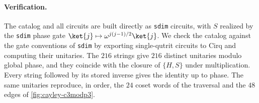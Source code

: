 \paragraph{Verification.}
The catalog and all circuits are built directly as \texttt{sdim} circuits, with $S$ realized by the \texttt{sdim} phase gate $\ket{j} \mapsto \omega^{j(j-1)/2} \ket{j}$. We check the catalog against the gate conventions of \texttt{sdim} by exporting single-qutrit circuits to Cirq and computing their unitaries. The $216$ strings give $216$ distinct unitaries modulo global phase, and they coincide with the closure of $\{H, S\}$ under multiplication. Every string followed by its stored inverse gives the identity up to phase. The same unitaries reproduce, in order, the $24$ coset words of the traversal and the $48$ edges of \autoref{fig:cayley-c3modp3}.
